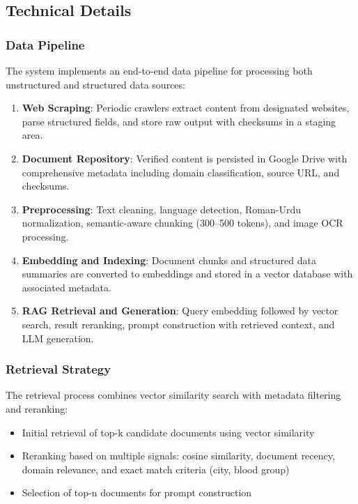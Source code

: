 \subsection{Technical Details}

\subsubsection{Data Pipeline}

The system implements an end-to-end data pipeline for processing both unstructured and structured data sources:

\begin{enumerate}
    \item \textbf{Web Scraping}: Periodic crawlers extract content from designated websites, parse structured fields, and store raw output with checksums in a staging area.
    \item \textbf{Document Repository}: Verified content is persisted in Google Drive with comprehensive metadata including domain classification, source URL, and checksums.
    \item \textbf{Preprocessing}: Text cleaning, language detection, Roman-Urdu normalization, semantic-aware chunking (300–500 tokens), and image OCR processing.
    \item \textbf{Embedding and Indexing}: Document chunks and structured data summaries are converted to embeddings and stored in a vector database with associated metadata.
    \item \textbf{RAG Retrieval and Generation}: Query embedding followed by vector search, result reranking, prompt construction with retrieved context, and LLM generation.
\end{enumerate}

\subsubsection{Retrieval Strategy}

The retrieval process combines vector similarity search with metadata filtering and reranking:

\begin{itemize}\setlength{\itemsep}{0pt}
    \item Initial retrieval of top-k candidate documents using vector similarity
    \item Reranking based on multiple signals: cosine similarity, document recency, domain relevance, and exact match criteria (city, blood group)
    \item Selection of top-n documents for prompt construction
\end{itemize}

